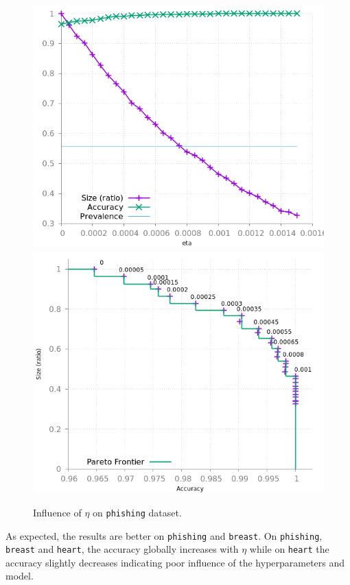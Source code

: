 \documentclass[sigconf,edbt]{acmart-edbt-workshops}
\begin{document}
\begin{figure}[!h]
\centering
\includegraphics[scale=0.35]{img/meta_phishing.png}
\hfill
\includegraphics[scale=0.35]{img/meta_pareto_phishing.png}
\caption{Influence of $\eta$ on \texttt{phishing} dataset.}
\label{fig:meta_phishing}
\end{figure}
As expected, the results are better on \texttt{phishing} and \texttt{breast}. On \texttt{phishing}, \texttt{breast} and \texttt{heart}, the accuracy globally increases with $\eta$ while on \texttt{heart} the accuracy slightly decreases indicating poor influence of the hyperparameters and model. 
\end{document}
